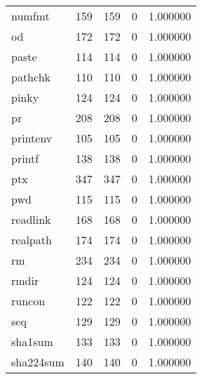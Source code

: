\begin{tabular}{lrrrr}
numfmt    &                     159 &              159 &                 0 &                     1.000000 \\
od        &                     172 &              172 &                 0 &                     1.000000 \\
paste     &                     114 &              114 &                 0 &                     1.000000 \\
pathchk   &                     110 &              110 &                 0 &                     1.000000 \\
pinky     &                     124 &              124 &                 0 &                     1.000000 \\
pr        &                     208 &              208 &                 0 &                     1.000000 \\
printenv  &                     105 &              105 &                 0 &                     1.000000 \\
printf    &                     138 &              138 &                 0 &                     1.000000 \\
ptx       &                     347 &              347 &                 0 &                     1.000000 \\
pwd       &                     115 &              115 &                 0 &                     1.000000 \\
readlink  &                     168 &              168 &                 0 &                     1.000000 \\
realpath  &                     174 &              174 &                 0 &                     1.000000 \\
rm        &                     234 &              234 &                 0 &                     1.000000 \\
rmdir     &                     124 &              124 &                 0 &                     1.000000 \\
runcon    &                     122 &              122 &                 0 &                     1.000000 \\
seq       &                     129 &              129 &                 0 &                     1.000000 \\
sha1sum   &                     133 &              133 &                 0 &                     1.000000 \\
sha224sum &                     140 &              140 &                 0 &                     1.000000 \\

\end{tabular}
